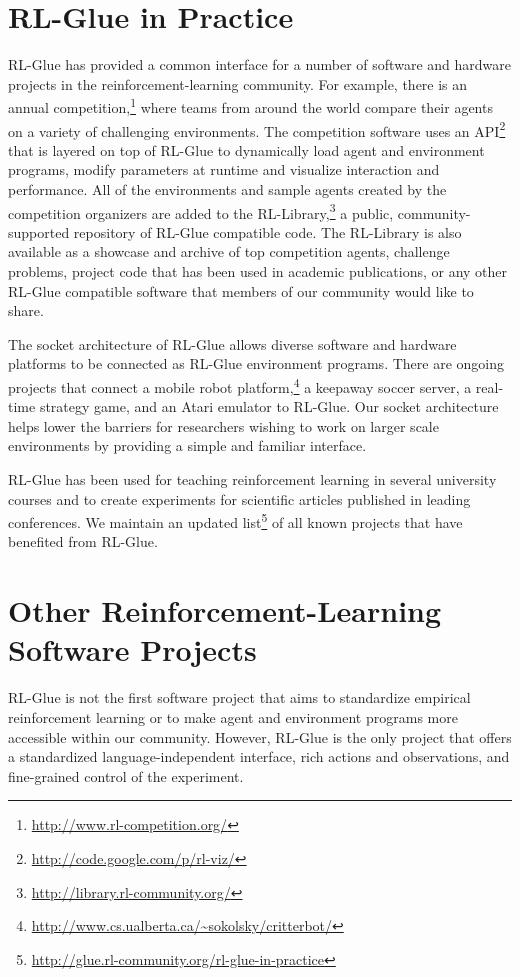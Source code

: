 \documentclass[twoside,11pt]{article}
\begin{document}
\section{RL-Glue in Practice}
RL-Glue has provided a common interface for a number of software and hardware projects in the reinforcement-learning community.  For example, there is an annual competition,\footnote{\url{http://www.rl-competition.org/}} where teams from around the world compare their agents on a variety of challenging environments.  The competition software uses an API\footnote{\url{http://code.google.com/p/rl-viz/}} that is layered on top of RL-Glue to dynamically load agent and environment programs, modify parameters at runtime and visualize interaction and performance.  All of the environments and sample agents created by the competition organizers are added to the RL-Library,\footnote{\url{http://library.rl-community.org/}} a public, community-supported repository of RL-Glue compatible code. The RL-Library is also available as a showcase and archive of top competition agents, challenge problems, project code that has been used in academic publications, or any other RL-Glue compatible software that members of our community would like to share.


The socket architecture of RL-Glue allows diverse software and hardware platforms to be connected as RL-Glue environment programs.  There are ongoing projects that connect a mobile robot platform,\footnote{\url{http://www.cs.ualberta.ca/~sokolsky/critterbot/}} a  keepaway soccer server, a real-time strategy game, and an Atari emulator to RL-Glue. Our socket architecture helps lower the barriers for researchers wishing to work on larger scale environments by providing a simple and familiar interface. %

RL-Glue has been used for teaching reinforcement learning in several university courses and to create experiments for scientific articles published in leading conferences. We maintain an updated list\footnote{\url{http://glue.rl-community.org/rl-glue-in-practice}} of all known projects that have benefited from RL-Glue.



\section{Other Reinforcement-Learning Software Projects}
RL-Glue is not the first software project that aims to  standardize empirical reinforcement learning or to make agent and environment programs more accessible within our community.  However, RL-Glue is the only project that offers a standardized language-independent interface, rich actions and observations, and fine-grained control of the experiment.
\end{document}
